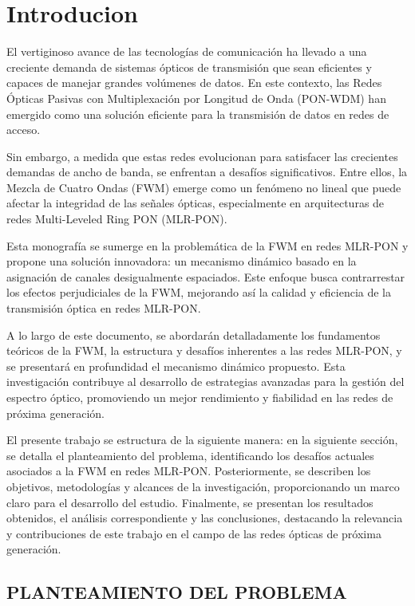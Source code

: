 \setcounter{page}{1}

\chapter{Introducion}
\label{chap1:introducion}

El vertiginoso avance de las tecnologías de comunicación ha llevado a una creciente demanda de sistemas ópticos de transmisión que sean eficientes y capaces de manejar grandes volúmenes de datos. En este contexto, las Redes Ópticas Pasivas con Multiplexación por Longitud de Onda (PON-WDM) han emergido como una solución eficiente para la transmisión de datos en redes de acceso.

Sin embargo, a medida que estas redes evolucionan para satisfacer las crecientes demandas de ancho de banda, se enfrentan a desafíos significativos. Entre ellos, la Mezcla de Cuatro Ondas (FWM) emerge como un fenómeno no lineal que puede afectar la integridad de las señales ópticas, especialmente en arquitecturas de redes Multi-Leveled Ring PON (MLR-PON).

Esta monografía se sumerge en la problemática de la FWM en redes MLR-PON y propone una solución innovadora: un mecanismo dinámico basado en la asignación de canales desigualmente espaciados. Este enfoque busca contrarrestar los efectos perjudiciales de la FWM, mejorando así la calidad y eficiencia de la transmisión óptica en redes MLR-PON.

A lo largo de este documento, se abordarán detalladamente los fundamentos teóricos de la FWM, la estructura y desafíos inherentes a las redes MLR-PON, y se presentará en profundidad el mecanismo dinámico propuesto. Esta investigación contribuye al desarrollo de estrategias avanzadas para la gestión del espectro óptico, promoviendo un mejor rendimiento y fiabilidad en las redes de próxima generación.

El presente trabajo se estructura de la siguiente manera: en la siguiente sección, se detalla el planteamiento del problema, identificando los desafíos actuales asociados a la FWM en redes MLR-PON. Posteriormente, se describen los objetivos, metodologías y alcances de la investigación, proporcionando un marco claro para el desarrollo del estudio. Finalmente, se presentan los resultados obtenidos, el análisis correspondiente y las conclusiones, destacando la relevancia y contribuciones de este trabajo en el campo de las redes ópticas de próxima generación.

\begin{center}
    \item \section{PLANTEAMIENTO DEL PROBLEMA}
\end{center}


